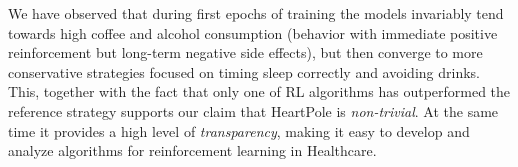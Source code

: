 We have observed that during first epochs of training the models invariably tend towards high coffee and alcohol consumption (behavior with immediate positive reinforcement but long-term negative side effects), but then converge to more conservative strategies focused on timing sleep correctly and avoiding drinks. 
This, together with the fact that only one of RL algorithms has outperformed the reference strategy supports our claim that HeartPole is \emph{non-trivial}.
At the same time it provides a high level of \emph{transparency}, making it easy to develop and analyze algorithms for reinforcement learning in Healthcare.